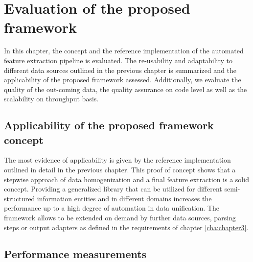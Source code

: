 \chapter{Evaluation of the proposed framework\label{cha:chapter6}}

In this chapter, the concept and the reference implementation of the automated feature extraction pipeline is evaluated. The re-usability and adaptability to different data sources outlined in the previous chapter is summarized and the applicability of the proposed framework assessed. Additionally, we evaluate the quality of the out-coming data, the quality assurance on code level as well as the scalability on throughput basis. 

\section{Applicability of the proposed framework concept}

The most evidence of applicability is given by the reference implementation outlined in detail in the previous chapter. This proof of concept shows that a stepwise approach of data homogenization and a final feature extraction is a solid concept. Providing a generalized library that can be utilized for different semi-structured information entities and in different domains increases the performance up to a high degree of automation in data unification. The framework allows to be extended on demand by further data sources, parsing steps or output adapters as defined in the requirements of chapter \ref{cha:chapter3}.

\section{Performance measurements\label{sec:performance}}

